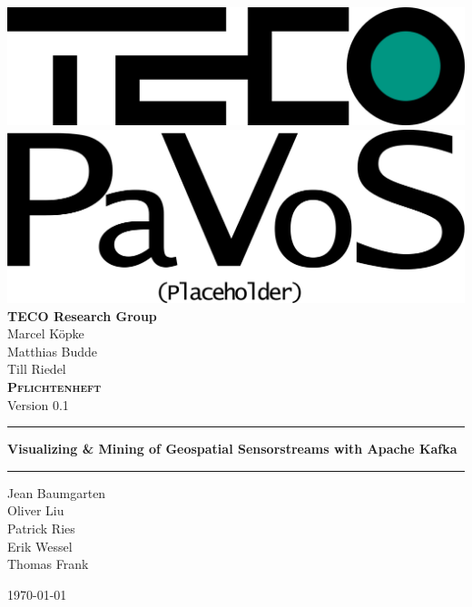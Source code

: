 \begin{titlepage}
	\begin{center}
	\includegraphics[width=0.5\linewidth]{images/TECOLogo.png}\\[0.5cm]
	\includegraphics[width=0.5\linewidth]{images/PaVoSLogo.png}\\[1cm]
	\textbf{TECO Research Group}\\[0.2cm]
	Marcel Köpke\\Matthias Budde\\Till Riedel\\[2cm]
	
	
	\textsc{\textbf{\LARGE Pflichtenheft}}\\
	{\small Version 0.1}\\
	
	\vspace{1cm}\hrule\vspace{0.4cm}
	\textbf{\huge Visualizing \& Mining of Geospatial Sensorstreams with Apache Kafka}\\
	\vspace{0.4cm}\hrule\vspace{1cm}
	
	{\Large Jean Baumgarten\\
	Oliver Liu\\
	Patrick Ries\\
	Erik Wessel\\
	Thomas Frank\\}
	\vspace{1.5cm}

	\today
	
	\end{center}
\end{titlepage}